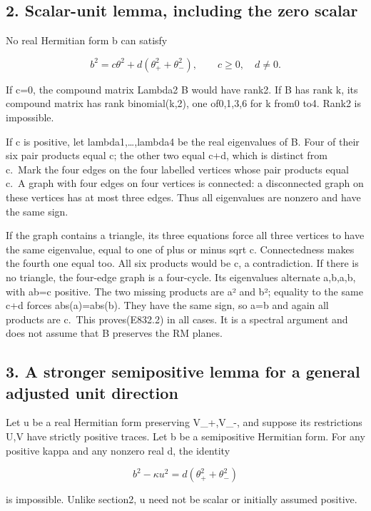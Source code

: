 \subsection{2. Scalar-unit lemma, including the zero
scalar}\label{SF-E832:scalar-unit-lemma-including-the-zero-scalar}

No real Hermitian form b can satisfy

\[
 b^2=c\theta^2+d(\theta_+^2+\theta_-^2),
 \qquad c\ge0,\quad d\ne0.
 \tag{E832.2}
\]

If c=0, the compound matrix Lambda2 B would have rank2. If B has rank k,
its compound matrix has rank binomial(k,2), one of0,1,3,6 for k from0
to4. Rank2 is impossible.

If c is positive, let lambda1,\ldots,lambda4 be the real eigenvalues of
B. Four of their six pair products equal c; the other two equal c+d,
which is distinct from c.~Mark the four edges on the four labelled
vertices whose pair products equal c.~A graph with four edges on four
vertices is connected: a disconnected graph on these vertices has at
most three edges. Thus all eigenvalues are nonzero and have the same
sign.

If the graph contains a triangle, its three equations force all three
vertices to have the same eigenvalue, equal to one of plus or minus sqrt
c. Connectedness makes the fourth one equal too. All six products would
be c, a contradiction. If there is no triangle, the four-edge graph is a
four-cycle. Its eigenvalues alternate a,b,a,b, with ab=c positive. The
two missing products are a² and b²; equality to the same c+d forces
abs(a)=abs(b). They have the same sign, so a=b and again all products
are c.~This proves(E832.2) in all cases. It is a spectral argument and
does not assume that B preserves the RM planes.

\subsection{3. A stronger semipositive lemma for a general adjusted unit
direction}\label{SF-E832:a-stronger-semipositive-lemma-for-a-general-adjusted-unit-direction}

Let u be a real Hermitian form preserving V\_+,V\_-, and suppose its
restrictions U,V have strictly positive traces. Let b be a semipositive
Hermitian form. For any positive kappa and any nonzero real d, the
identity

\[
 b^2-\kappa u^2=d(\theta_+^2+\theta_-^2)
 \tag{E832.3}
\]

is impossible. Unlike section2, u need not be scalar or initially
assumed positive.

